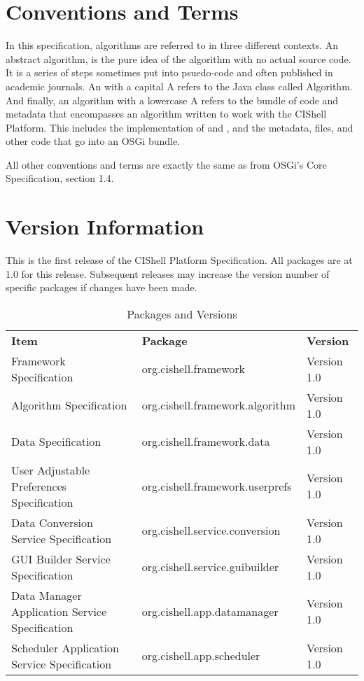\section{Conventions and Terms}

In this specification, algorithms are referred to in three different contexts. An
abstract algorithm, is the pure idea of the algorithm with no actual source code.
It is a series of steps sometimes put into psuedo-code and often published in
academic journals. An  with a capital A refers to the Java class
called Algorithm. And finally, an algorithm with a lowercase A refers to the
bundle of code and metadata that encompasses an algorithm written to work with
the CIShell Platform. This includes the implementation of
 and , and the metadata, files, and
other code that go into an OSGi bundle.

All other conventions and terms are exactly the same as from OSGi's Core
Specification, section 1.4.

\section{Version Information}

This is the first release of the CIShell Platform Specification. All packages are
at 1.0 for this release. Subsequent releases may increase the version number of
specific packages if changes have been made.

\begin{table}[h!]
\begin{tabular}{l l l}
\textbf{Item} & \textbf{Package} & \textbf{Version} \\
Framework Specification & org.cishell.framework & Version 1.0 \\
Algorithm Specification & org.cishell.framework.algorithm & Version 1.0 \\
Data Specification & org.cishell.framework.data & Version 1.0 \\
User Adjustable Preferences Specification & org.cishell.framework.userprefs &
Version 1.0 \\
Data Conversion Service Specification & org.cishell.service.conversion &
Version 1.0 \\
GUI Builder Service Specification & org.cishell.service.guibuilder & Version
1.0 \\
Data Manager Application Service Specification & org.cishell.app.datamanager &
Version 1.0 \\
Scheduler Application Service Specification & org.cishell.app.scheduler &
Version 1.0 \\
\end{tabular}
\caption{Packages and Versions}
\label{table:packageVersions}
\end{table}